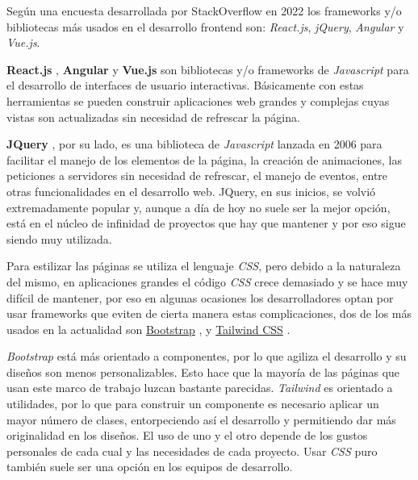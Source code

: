 Según una encuesta desarrollada por StackOverflow \cite{encuesta2022} en 2022 los frameworks y/o bibliotecas más usados en el desarrollo frontend son: \textit{React.js}, \textit{jQuery}, \textit{Angular} y \textit{Vue.js}.
\newline

\textbf{React.js} \cite{react}, \textbf{Angular} \cite{angular} y \textbf{Vue.js} \cite{vue} son bibliotecas y/o frameworks de \textit{Javascript} para el desarrollo de interfaces de usuario interactivas. Básicamente con estas herramientas se pueden construir aplicaciones web grandes y complejas cuyas vistas son actualizadas sin necesidad de refrescar la página.
\newline

\textbf{JQuery} \cite{jquery}, por su lado, es una biblioteca de \textit{Javascript} lanzada en 2006 para facilitar el manejo de los elementos de la página, la creación de animaciones, las peticiones a servidores sin necesidad de refrescar, el manejo de eventos, entre otras funcionalidades en el desarrollo web. JQuery, en sus inicios, se volvió extremadamente popular y, aunque a día de hoy no suele ser la mejor opción, está en el núcleo de infinidad de proyectos que hay que mantener y por eso sigue siendo muy utilizada.
\newline

Para estilizar las páginas se utiliza el lenguaje \textit{CSS}, pero debido a la naturaleza del mismo, en aplicaciones grandes el código \textit{CSS} crece demasiado y se hace muy difícil de mantener, por eso en algunas ocasiones los desarrolladores optan por usar frameworks que eviten de cierta manera estas complicaciones, dos de los más usados en la actualidad son \href{getbootstrap.com}{Bootstrap} \cite{bootstrap}, y \href{tailwindcss.com}{Tailwind CSS} \cite{tailwind}.
\newline

\textit{Bootstrap} está más orientado a componentes, por lo que agiliza el desarrollo y su diseños son menos personalizables. Esto hace que la mayoría de las páginas que usan este marco de trabajo luzcan bastante parecidas. \textit{Tailwind} es orientado a utilidades, por lo que para construir un componente es necesario aplicar un mayor número de clases, entorpeciendo así el desarrollo y permitiendo dar más originalidad en los diseños. El uso de uno y el otro depende de los gustos personales de cada cual y las necesidades de cada proyecto. Usar \textit{CSS} puro también suele ser una opción en los equipos de desarrollo.
\newline

